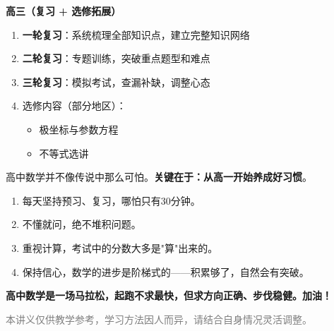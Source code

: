 \documentclass[12pt, a4paper]{ctexart}
\begin{document}
\begin{knowledgebox}
\vspace{8pt}
\textbf{高三（复习 + 选修拓展）}
\begin{enumerate}[label=\textbf{\arabic*.}, leftmargin=2.5em]
  \item \textbf{一轮复习}：系统梳理全部知识点，建立完整知识网络
  \item \textbf{二轮复习}：专题训练，突破重点题型和难点
  \item \textbf{三轮复习}：模拟考试，查漏补缺，调整心态
  \item 选修内容（部分地区）：
    \begin{itemize}
      \item 极坐标与参数方程
      \item 不等式选讲
    \end{itemize}
\end{enumerate}
\end{knowledgebox}

\begin{tipbox}[给准高一同学的寄语]
高中数学并不像传说中那么可怕。\textbf{关键在于：从高一开始养成好习惯}。

\begin{enumerate}[leftmargin=2.5em]
  \item 每天坚持预习、复习，哪怕只有30分钟。
  \item 不懂就问，绝不堆积问题。
  \item 重视计算，考试中的分数大多是"算"出来的。
  \item 保持信心，数学的进步是阶梯式的——积累够了，自然会有突破。
\end{enumerate}

\textbf{高中数学是一场马拉松，起跑不求最快，但求方向正确、步伐稳健。加油！}
\end{tipbox}

\vfill
\begin{center}
\small\textcolor{gray}{本讲义仅供教学参考，学习方法因人而异，请结合自身情况灵活调整。}
\end{center}
\end{document}
